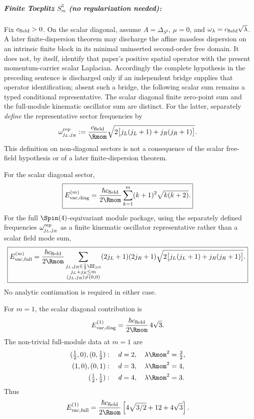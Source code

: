 \documentclass[11pt,a4paper]{article}
\begin{document}
\subparagraph{\texorpdfstring{Finite Toeplitz $S^3_m$ (no regularization needed):}{Finite Toeplitz S^3_m (no regularization needed):}}
\begin{proposition}
\label{p2:prop:casimir-fuzzy}
Fix \(c_{\rm field}>0\).  On the scalar diagonal, assume
\(A=\Delta_{S^3}\), \(\mu=0\), and
\(\omega_\lambda=c_{\rm field}\sqrt{\lambda}\).
A later finite-dispersion theorem may discharge the affine massless dispersion
on an intrinsic finite block in its minimal uninserted second-order free
domain.  It does not, by
itself, identify that paper's positive spatial operator with the present
momentum-carrier scalar Laplacian.  Accordingly the complete hypothesis in
the preceding sentence is discharged only if an independent bridge supplies
that operator identification; absent such a bridge, the following scalar
sum remains a typed conditional representative.  The scalar diagonal finite
zero-point sum and the full-module
kinematic oscillator sum are distinct.  For the latter, separately
\emph{define} the representative sector frequencies by
\[
\omega_{j_L,j_R}^{\rm rep}
:=
\frac{c_{\rm field}}{\Rmom}
\sqrt{2\bigl[j_L(j_L+1)+j_R(j_R+1)\bigr]}.
\]
This definition on non-diagonal sectors is not a consequence of the scalar
free-field hypothesis or of a later finite-dispersion theorem.

For the scalar diagonal sector,
\[
\boxed{
E_{\mathrm{vac,diag}}^{(m)}
=
\frac{\hbar c_{\rm field}}{2\Rmom}
\sum_{k=1}^{m}(k+1)^2\sqrt{k(k+2)}.
}
\]
For the full \(\Spin(4)\)-equivariant module package, using the separately
defined frequencies \(\omega_{j_L,j_R}^{\rm rep}\) as a finite kinematic
oscillator representative rather than a scalar field mode sum,
\[
\boxed{
E_{\mathrm{vac,full}}^{(m)}
=
\frac{\hbar c_{\rm field}}{2\Rmom}
\sum_{\substack{j_L,j_R\in\frac12\ZZ_{\ge0}\\j_L+j_R\le m\\(j_L,j_R)\ne(0,0)}}
(2j_L+1)(2j_R+1)
\sqrt{2\bigl[j_L(j_L+1)+j_R(j_R+1)\bigr]}.
}
\]
No analytic continuation is required in either case.

For \(m=1\), the scalar diagonal contribution is
\[
E_{\mathrm{vac,diag}}^{(1)}
=
\frac{\hbar c_{\rm field}}{2\Rmom}\,4\sqrt3.
\]
The non-trivial full-module data at \(m=1\) are
\[
\begin{aligned}
(\tfrac12,0),(0,\tfrac12)&:\quad d=2,\quad \lambda\Rmom^2=\tfrac32,\\
(1,0),(0,1)&:\quad d=3,\quad \lambda\Rmom^2=4,\\
(\tfrac12,\tfrac12)&:\quad d=4,\quad \lambda\Rmom^2=3.
\end{aligned}
\]
Thus
\begin{equation}
E_{\mathrm{vac,full}}^{(1)}
=
\frac{\hbar c_{\rm field}}{2\Rmom}
\left[4\sqrt{3/2}+12+4\sqrt3\right].
\end{equation}
\end{proposition}
\end{document}
